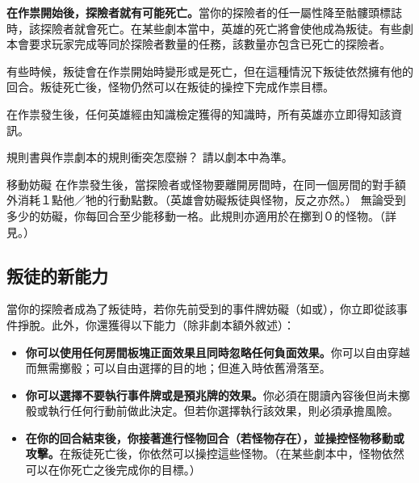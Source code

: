 \textbf{在作祟開始後，探險者就有可能死亡。}當你的探險者的任一屬性降至骷髏頭標誌\SkullSymbol{}時，該探險者就會死亡。在某些劇本當中，英雄的死亡將會使他成為叛徒。有些劇本會要求玩家完成等同於探險者數量的任務，該數量亦包含已死亡的探險者。

有些時候，叛徒會在作祟開始時變形或是死亡，但在這種情況下叛徒依然擁有他的回合。叛徒死亡後，怪物仍然可以在叛徒的操控下完成作祟目標。

在作祟發生後，任何英雄經由知識檢定獲得的知識時，所有英雄亦立即得知該資訊。

\begin{RuleBox}{規則書與作祟劇本的規則衝突怎麼辦？}
  請以劇本中為準。
\end{RuleBox}

\begin{RuleBox}{移動妨礙}
  在作祟發生後，當探險者或怪物要離開房間時，在同一個房間的對手額外消耗１點他／牠的行動點數。（英雄會妨礙叛徒與怪物，反之亦然。）
  無論受到多少的妨礙，你每回合至少能移動一格。此規則亦適用於在擲到０的怪物。（詳見。）
\end{RuleBox}


\subsection{叛徒的新能力}\label{ssec:traitors-new-power}

當你的探險者成為了叛徒時，若你先前受到的事件牌妨礙（如或），你立即從該事件掙脫。此外，你還獲得以下能力（除非劇本額外敘述）：

\begin{itemize}
  \item \textbf{你可以使用任何房間板塊正面效果且同時忽略任何負面效果。}你可以自由穿越而無需擲骰；可以自由選擇的目的地；但進入時依舊滑落至。
  \item \textbf{你可以選擇不要執行事件牌或是預兆牌的效果。}你必須在閱讀內容後但尚未擲骰或執行任何行動前做此決定。但若你選擇執行該效果，則必須承擔風險。
  \item \textbf{在你的回合結束後，你接著進行怪物回合（若怪物存在），並操控怪物移動或攻擊。}在叛徒死亡後，你依然可以操控這些怪物。（在某些劇本中，怪物依然可以在你死亡之後完成你的目標。）
\end{itemize}

